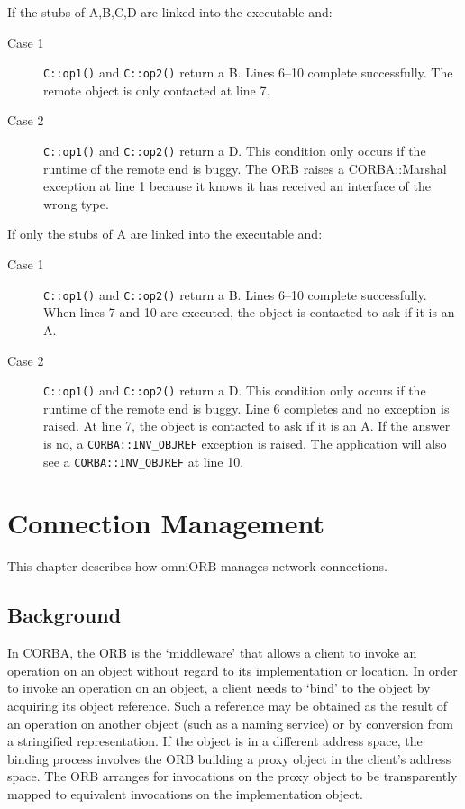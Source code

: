 \documentclass[11pt,twoside,a4paper]{book}
\newcommand{\code}[1]{\texttt{#1}}
\newcommand{\op}[1]{\texttt{#1()}}
\begin{document}
\noindent If the stubs of A,B,C,D are linked into the executable and:

\begin{description}
\item[Case 1] \op{C::op1} and \op{C::op2} return a B. Lines 6--10
complete successfully. The remote object is only contacted at line 7.

\item[Case 2] \op{C::op1} and \op{C::op2} return a D. This condition
only occurs if the runtime of the remote end is buggy. The ORB raises
a CORBA::Marshal exception at line 1 because it knows it has received
an interface of the wrong type.
\end{description}

\noindent If only the stubs of A are linked into the executable and:

\begin{description}
\item[Case 1] \op{C::op1} and \op{C::op2} return a B. Lines 6--10
complete successfully. When lines 7 and 10 are executed, the object is
contacted to ask if it is an A.

\item[Case 2] \op{C::op1} and \op{C::op2} return a D. This condition
only occurs if the runtime of the remote end is buggy. Line 6
completes and no exception is raised. At line 7, the object is
contacted to ask if it is an A. If the answer is no, a
\code{CORBA::INV\_OBJREF} exception is raised. The application will
also see a \code{CORBA::INV\_OBJREF} at line 10.
\end{description}









\chapter{Connection Management}
\label{ch_conn}


This chapter describes how omniORB manages network connections.

\section{Background}

In CORBA, the ORB is the `middleware' that allows a client to invoke
an operation on an object without regard to its implementation or
location. In order to invoke an operation on an object, a client needs
to `bind' to the object by acquiring its object reference. Such a
reference may be obtained as the result of an operation on another
object (such as a naming service) or by conversion from a stringified
representation. If the object is in a different address space, the
binding process involves the ORB building a proxy object in the
client's address space. The ORB arranges for invocations on the proxy
object to be transparently mapped to equivalent invocations on the
implementation object.
\end{document}
